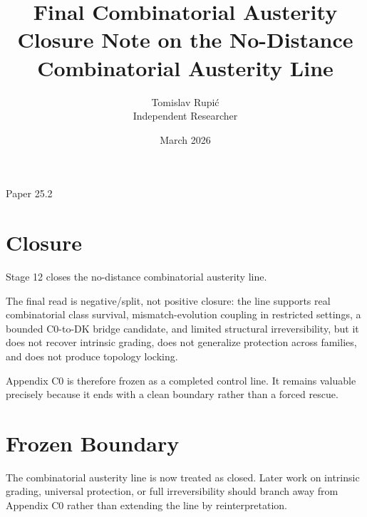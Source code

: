 \documentclass[11pt]{article}
\title{Final Combinatorial Austerity Closure Note on the No-Distance Combinatorial Austerity Line}
\author{Tomislav Rupi\'c \\ Independent Researcher}
\date{March 2026}
\begin{document}
\maketitle
\begin{center}
\large Paper 25.2
\end{center}

\section*{Closure}

Stage 12 closes the no-distance combinatorial austerity line.

The final read is negative/split, not positive closure: the line supports real combinatorial class survival, mismatch-evolution coupling in restricted settings, a bounded C0-to-DK bridge candidate, and limited structural irreversibility, but it does not recover intrinsic grading, does not generalize protection across families, and does not produce topology locking.

Appendix C0 is therefore frozen as a completed control line. It remains valuable precisely because it ends with a clean boundary rather than a forced rescue.

\section*{Frozen Boundary}

The combinatorial austerity line is now treated as closed. Later work on intrinsic grading, universal protection, or full irreversibility should branch away from Appendix C0 rather than extending the line by reinterpretation.
\end{document}
